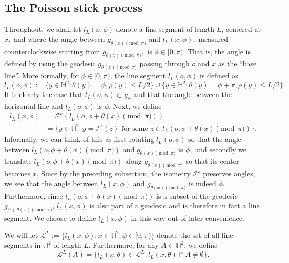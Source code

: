 \documentclass[10pt,a4paper]{amsart}
\newcommand{\BH}{{\mathbb{H}}}
\newcommand{\CI}{{\mathcal{I}}}
\newcommand{\CL}{{\mathcal{L}}}
\begin{document}
\subsection{The Poisson stick process} \label{sec:Poistick}
Throughout, we shall let $l_L(x,\phi)$ denote a line segment of length $L$,
centered at $x,$ and where the angle between $g_{\theta(x) \pmod \pi}$ and
$l_L(x,\phi),$ measured counterclockwise starting from $g_{\theta(x) \pmod \pi},$ 
is $\phi\in[0,\pi).$ 
That is, the angle is defined by using the geodesic 
$g_{\theta(x) \pmod \pi}$ passing through $o$ and $x$ as the ``base line''.
More formally, for $\phi\in[0,\pi)$, the line segment $l_L(o,\phi)$ is defined as 
\[
l_L(o,\phi):=\{y\in \BH^2: \theta(y)=\phi, \rho(y)\leq L/2\}
\cup 
\{y\in \BH^2: \theta(y)=\phi+\pi, \rho(y)\leq L/2\}.
\]
It is clearly the case that $l_L(o,\phi) \subset g_\phi$ and that the angle between 
the horizontal line and $l_L(o,\phi)$ is $\phi.$
Next, we define 
\begin{align*}
l_L(x,\phi)& =\CI^x\left(l_L(o,\phi+\theta(x) \pmod \pi)\right) \\
& =\{y\in \BH^2:y=\CI^x(z) \textrm{ for some } z\in l_L(o,\phi+\theta(x) \pmod \pi)\}.
\end{align*}
Informally, we can think of this as first rotating $l_L(o,\phi)$ so that the angle between 
$l_L(o,\phi+\theta(x) \pmod \pi)$ and $g_{\theta(x) \pmod \pi}$ is $\phi,$ and secondly 
we translate $l_L(o,\phi+\theta(x) \pmod \pi)$ along $g_{\theta(x) \pmod \pi}$ so that its 
center becomes $x$. Since by the preceding subsection, the isometry $\CI^x$ 
preserves angles, we see that the angle between $l_L(x,\phi)$ and $g_{\theta(x) \pmod \pi}$
is indeed $\phi.$
Furthermore, since $l_L(o,\phi+\theta(x) \pmod \pi)$ is a subset of the geodesic 
$g_{\phi+\theta(x) \pmod \pi}$, $l_L(x,\phi)$ is also part of a geodesic and 
is therefore in fact a line segment. 
We choose to define 
$l_L(x,\phi)$ in this way out of later convenience.

We will let $\CL^L:=\{l_L(x,\phi): x\in \BH^2, \phi\in[0,\pi)\}$ denote the 
set of all 
line segments in $\BH^2$ of length $L.$ Furthermore, for any $A \subset \BH^2$, we define  
\begin{equation} \label{eqn:defCLA}
\CL^L(A)=\{l_L(x,\theta)\in \CL^L: l_L(x,\theta)\cap A \neq \emptyset\}.    
\end{equation}
\end{document}
